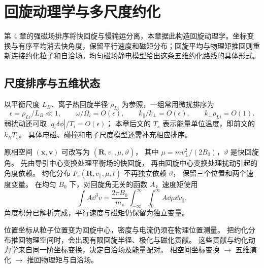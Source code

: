 \chapter{回旋动理学与多尺度约化}\label{ch:19}
\begin{chaptersummary}
第 4 章的强磁场排序将快回旋与慢输运分离，本章据此构造回旋动理学。坐标变换与有序平均消去快角度，保留平行速度和磁矩分布；回旋平均与物理矩推回则重新连接约化粒子和自洽场。均匀磁场静电模型给出这条五维约化路线的具体形式。
\end{chaptersummary}

\section{尺度排序与五维状态}
以平衡尺度 $L_B$、离子热回旋半径 $\rho_{Li}$ 为参照，一组常用微扰排序为
\[
\epsilon=\rho_{Li}/L_B\ll1,\qquad
\omega/\Omega_i=O(\epsilon),\qquad
k_\parallel/k_\perp=O(\epsilon),\qquad
k_\perp\rho_{Li}=O(1).
\]
弱扰动还可取 $|q_i\delta\phi|/T_i=O(\epsilon)$；
本章后文的 $T_s$ 表示能量单位温度，即前文的 $k_BT_s$。
具体电磁、碰撞和电子尺度模型还需补充相应排序。

原相空间 $(\bm x,\bm v)$ 可改写为
$(\bm R,v_\parallel,\mu,\vartheta)$，
其中 $\mu=m v_\perp^2/(2B_0)$，$\vartheta$ 是快回旋角。
先由导引中心变换处理平衡场的快回旋，
再由回旋中心变换处理扰动引起的角度依赖。
约化分布 $F_s(\bm R,v_\parallel,\mu,t)$ 不再独立依赖 $\vartheta$，
保留三个位置和两个速度变量。
在均匀 $B_0$ 下，对回旋角无关的函数 $A$，速度矩使用
\[
\int A\dd^3v=\frac{2\pi B_0}{m_s}
\int_{-\infty}^{\infty}\int_0^\infty A\dd\mu\dd v_\parallel.
\]
角度积分已解析完成，平行速度与磁矩仍保留为独立变量。

{位置坐标从粒子位置变为回旋中心，密度与电流仍须在物理位置测量。
把约化分布推回物理空间时，会出现有限回旋半径、极化与磁化贡献。
这些贡献与约化动力学来自同一阶坐标变换，决定自洽场及能量配对。}
{相空间坐标变换 $\longrightarrow$ 五维演化 $\longrightarrow$ 推回物理矩与自洽场。}

